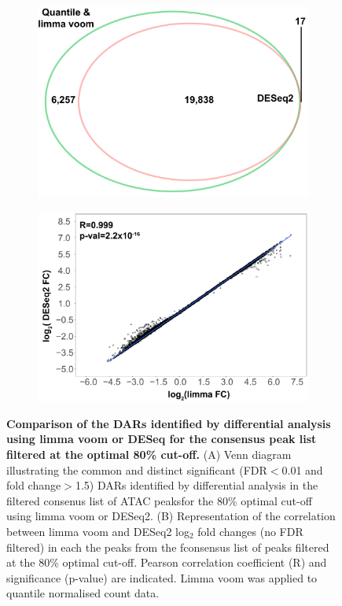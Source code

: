 \begin{figure}[htbp]
\centering
\begin{subfigure}{0.5\textwidth}
\centering
\includegraphics[width=\textwidth]{./Results1/pdfs/ATAC_Core_fresh_CD4vsCD14_venn_diagram_differential_analysis_FDR_01_quantile_DESeq2_only}
\caption{\textbf{}}
\end{subfigure}
\begin{subfigure}{0.5\textwidth}
\centering
\includegraphics[width=\textwidth]{./Results1/pdfs/ATAC_Core_fastq_CD4_CD14_80pcnt_cut_off_correlation_log2FC_quantile_vs_deseq2}
\caption{\textbf{}} %
\end{subfigure}
\caption[Comparison of the DARs identified by differential analysis using limma voom or DESeq for the consensus peak list filtered at the optimal 80\% cut-off.]{\textbf{Comparison of the DARs identified by differential analysis using limma voom or DESeq for the consensus peak list filtered at the optimal 80\% cut-off.} (A) Venn diagram illustrating the common and distinct significant (FDR$<$0.01 and fold change$>$1.5) DARs identified by differential analysis in the filtered consenus list of ATAC peaksfor the 80\% optimal cut-off using limma voom or DESeq2. (B) Representation of the correlation between limma voom and DESeq2 log$_2$ fold changes (no FDR filtered) in each the peaks from the fconsensus list of peaks filtered at the 80\% optimal cut-off. Pearson correlation coefficient (R) and significance (p-value) are indicated. Limma voom was applied to quantile normalised count data.}

\end{figure}
